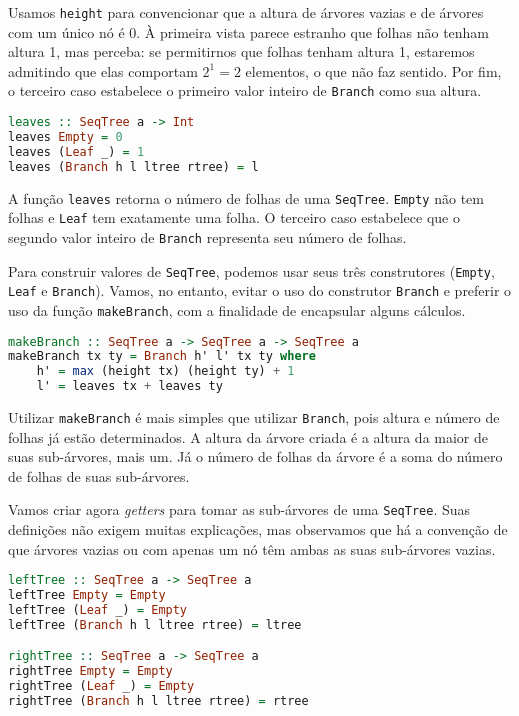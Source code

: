 \documentclass[a4paper]{article}
\begin{document}
Usamos \texttt{height} para convencionar que a altura de árvores vazias e de árvores com um único nó é 0.
À primeira vista parece estranho que folhas não tenham altura 1, mas perceba: se permitirnos que folhas tenham altura 1, estaremos admitindo que elas comportam $2^1 = 2$ elementos, o que não faz sentido.
Por fim, o terceiro caso estabelece o primeiro valor inteiro de \texttt{Branch} como sua altura.

\begin{lstlisting}[language=haskell, frame=single]
leaves :: SeqTree a -> Int
leaves Empty = 0
leaves (Leaf _) = 1
leaves (Branch h l ltree rtree) = l
\end{lstlisting}

A função \texttt{leaves} retorna o número de folhas de uma \texttt{SeqTree}.
\texttt{Empty} não tem folhas e \texttt{Leaf} tem exatamente uma folha.
O terceiro caso estabelece que o segundo valor inteiro de \texttt{Branch} representa seu número de folhas.

Para construir valores de \texttt{SeqTree}, podemos usar seus três construtores (\texttt{Empty}, \texttt{Leaf} e \texttt{Branch}).
Vamos, no entanto, evitar o uso do construtor \texttt{Branch} e preferir o uso da função \texttt{makeBranch}, com a finalidade de encapsular alguns cálculos.

\begin{lstlisting}[language=haskell, frame=single]
makeBranch :: SeqTree a -> SeqTree a -> SeqTree a
makeBranch tx ty = Branch h' l' tx ty where
	h' = max (height tx) (height ty) + 1
	l' = leaves tx + leaves ty
\end{lstlisting}

Utilizar \texttt{makeBranch} é mais simples que utilizar \texttt{Branch}, pois altura e número de folhas já estão determinados.
A altura da árvore criada é a altura da maior de suas sub-árvores, mais um.
Já o número de folhas da árvore é a soma do número de folhas de suas sub-árvores.

Vamos criar agora \emph{getters} para tomar as sub-árvores de uma \texttt{SeqTree}.
Suas definições não exigem muitas explicações, mas observamos que há a convenção de que árvores vazias ou com apenas um nó têm ambas as suas sub-árvores vazias.

\begin{lstlisting}[language=haskell, frame=single]
leftTree :: SeqTree a -> SeqTree a
leftTree Empty = Empty
leftTree (Leaf _) = Empty
leftTree (Branch h l ltree rtree) = ltree

rightTree :: SeqTree a -> SeqTree a
rightTree Empty = Empty
rightTree (Leaf _) = Empty
rightTree (Branch h l ltree rtree) = rtree
\end{lstlisting}
\end{document}
